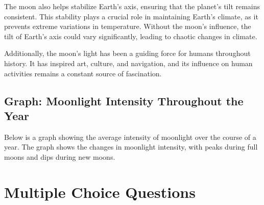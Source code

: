 \documentclass[12pt]{article}
\begin{document}
The moon also helps stabilize Earth's axis, ensuring that the planet’s tilt remains consistent. This stability plays a crucial role in maintaining Earth's climate, as it prevents extreme variations in temperature. Without the moon's influence, the tilt of Earth's axis could vary significantly, leading to chaotic changes in climate.

Additionally, the moon's light has been a guiding force for humans throughout history. It has inspired art, culture, and navigation, and its influence on human activities remains a constant source of fascination.

\vspace{1cm}

\subsection*{Graph: Moonlight Intensity Throughout the Year}

Below is a graph showing the average intensity of moonlight over the course of a year. The graph shows the changes in moonlight intensity, with peaks during full moons and dips during new moons.

\begin{center}
\end{center}

\vspace{1cm}

\section*{Multiple Choice Questions}
\end{document}
